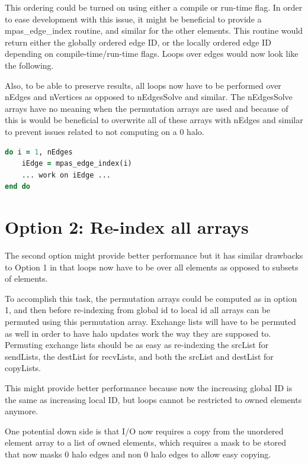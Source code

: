 \documentclass[11pt]{report}
\begin{document}
This ordering could be turned on using either a compile or run-time flag. In order to ease development with this issue, it might be beneficial to provide a mpas\_edge\_index routine, and similar for the other elements. This routine would return either the globally ordered edge ID, or the locally ordered edge ID depending on compile-time/run-time flags. Loops over edges would now look like the following.

Also, to be able to preserve results, all loops now have to be performed over nEdges and nVertices as opposed to nEdgesSolve and similar. The nEdgesSolve arrays have no meaning when the permutation arrays are used and because of this is would be beneficial to overwrite all of these arrays with nEdges and similar to prevent issues related to not computing on a 0 halo.

\begin{lstlisting}[language=fortran,escapechar=@,frame=single]
do i = 1, nEdges
	iEdge = mpas_edge_index(i)
	... work on iEdge ...
end do
\end{lstlisting}

\section{Option 2: Re-index all arrays}
The second option might provide better performance but it has similar drawbacks to Option 1 in that loops now have to be over all elements as opposed to subsets of elements.

To accomplish this task, the permutation arrays could be computed as in option 1, and then before re-indexing from global id to local id all arrays can be permuted using this permutation array. Exchange lists will have to be permuted as well in order to have halo updates work the way they are supposed to. Permuting exchange lists should be as easy as re-indexing the srcList for sendLists, the destList for recvLists, and both the srcList and destList for copyLists.

This might provide better performance because now the increasing global ID is the same as increasing local ID, but loops cannot be restricted to owned elements anymore.

One potential down side is that I/O now requires a copy from the unordered element array to a list of owned elements, which requires a mask to be stored that now masks 0 halo edges and non 0 halo edges to allow easy copying.

\end{document}
